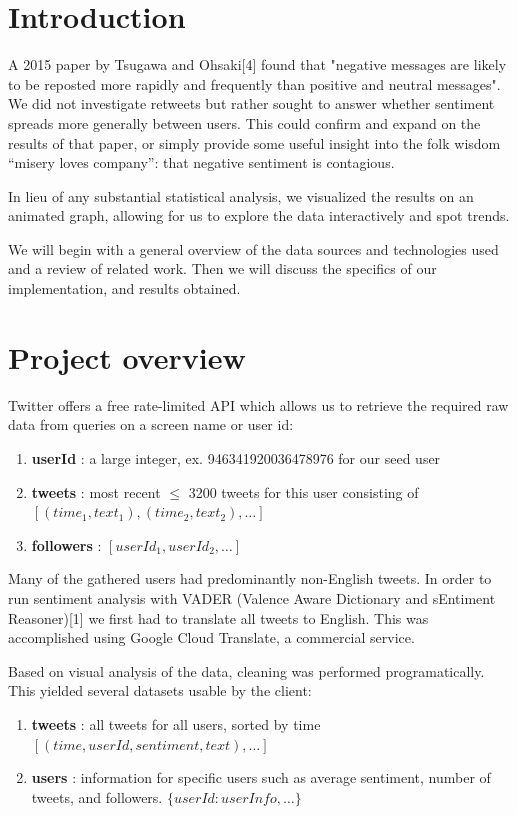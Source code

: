 \documentclass[11pt]{article}
\begin{document}
\section{Introduction}

A 2015 paper by Tsugawa and Ohsaki[4] found that "negative messages are likely to be reposted more rapidly and frequently than positive and neutral messages". We did not investigate retweets but rather sought to answer whether sentiment spreads more generally between users. This could confirm and expand on the results of that paper, or simply provide some useful insight into the folk wisdom “misery loves company”: that negative sentiment is contagious.\newline

In lieu of any substantial statistical analysis, we visualized the results on an animated graph, allowing for us to explore the data interactively and spot trends.\newline

We will begin with a general overview of the data sources and technologies used and a review of related work. Then we will discuss the specifics of our implementation, and results obtained.


\section{Project overview}

Twitter offers a free rate-limited API which allows us to retrieve the required raw data from queries on a screen name or user id:
\begin{enumerate}
    \item \textbf{userId} : a large integer, ex. 946341920036478976 for our seed user
    \item \textbf{tweets} : most recent $\leq$ 3200 tweets for this user consisting of\newline
    $[(time_1, text_1), (time_2, text_2), \dots]$ 
    \item \textbf{followers} : $[userId_1, userId_2, \dots]$
\end{enumerate}

Many of the gathered users had predominantly non-English tweets. In order to run sentiment analysis with VADER (Valence Aware Dictionary and sEntiment Reasoner)[1] we first had to translate all tweets to English. This was accomplished using Google Cloud Translate, a commercial service.\newline

Based on visual analysis of the data, cleaning was performed programatically. This yielded several datasets usable by the client:
\begin{enumerate}
    \item \textbf{tweets} : all tweets for all users, sorted by time $[(time, userId, sentiment, text), \dots]$
    \item \textbf{users} : information for specific users such as average sentiment, number of tweets, and followers. $\{userId: userInfo, \dots\}$
\end{enumerate}
\end{document}
